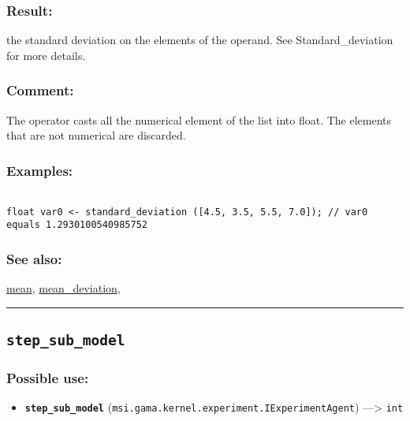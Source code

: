\documentclass[]{book}
\providecommand{\tightlist}{%
  \setlength{\itemsep}{0pt}\setlength{\parskip}{0pt}}
\theoremstyle{definition}
\theoremstyle{definition}
\theoremstyle{definition}
\theoremstyle{remark}
\begin{document}
\subsubsection{Result:}\label{result-485}

the standard deviation on the elements of the operand. See
Standard\_deviation for more details.

\subsubsection{Comment:}\label{comment-94}

The operator casts all the numerical element of the list into float. The
elements that are not numerical are discarded.

\subsubsection{Examples:}\label{examples-350}

\begin{verbatim}
 
float var0 <- standard_deviation ([4.5, 3.5, 5.5, 7.0]); // var0 equals 1.2930100540985752
\end{verbatim}

\subsubsection{See also:}\label{see-also-197}

\href{operators-i-to-m.html\#mean}{mean},
\href{operators-i-to-m.html\#mean_deviation}{mean\_deviation},

\begin{center}\rule{0.5\linewidth}{\linethickness}\end{center}

\subsection{\texorpdfstring{\texttt{step\_sub\_model}}{step\_sub\_model}}\label{step_sub_model}

\subsubsection{Possible use:}\label{possible-use-503}

\begin{itemize}
\tightlist
\item
  \textbf{\texttt{step\_sub\_model}}
  (\texttt{msi.gama.kernel.experiment.IExperimentAgent})
  ---\textgreater{} \texttt{int}
\end{itemize}
\end{document}
